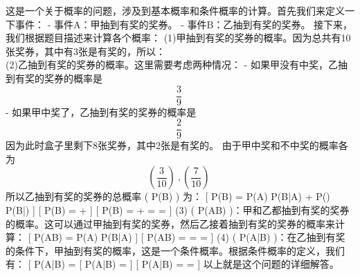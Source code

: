 
这是一个关于概率的问题，涉及到基本概率和条件概率的计算。首先我们来定义一下事件： - 事件A：甲抽到有奖的奖券。 - 事件B：乙抽到有奖的奖券。 接下来，我们根据题目描述来计算各个概率： (1)甲抽到有奖的奖券的概率。因为总共有10张奖券，其中有3张是有奖的，所以： \begin{equation}
[ P(A) = \frac{3}{10} ] ~
\end{equation}(2)乙抽到有奖的奖券的概率。这里需要考虑两种情况： - 如果甲没有中奖，乙抽到有奖的奖券的概率是
\begin{equation}
 \frac{3}{9}~
\end{equation}
 - 如果甲中奖了，乙抽到有奖的奖券的概率是 \begin{equation}
 \frac{2}{9}~
 \end{equation}因为此时盒子里剩下8张奖券，其中2张是有奖的。 由于甲中奖和不中奖的概率各为 \begin{equation}
 ( \frac{3}{10} )~,(\frac{7}{10})~
 \end{equation}所以乙抽到有奖的奖券的总概率 ( P(B) ) 为： [ P(B) = P(A) \cdot P(B|A) + P() \cdot P(B|) ] [ P(B) =  \cdot {} +  \cdot {} ] [ P(B) =  +  =  =  ] (3) ( P(AB) )：甲和乙都抽到有奖的奖券的概率。这可以通过甲抽到有奖的奖券，然后乙接着抽到有奖的奖券的概率来计算： [ P(AB) = P(A) \cdot P(B|A) ] [ P(AB) =  \cdot {} =  =  ] (4) ( P(A|B) )：在乙抽到有奖的条件下，甲抽到有奖的概率，这是一个条件概率。根据条件概率的定义，我们有： [ P(A|B) =  [ P(A|B) =  ] [ P(A|B) =  \cdot {} =  ] 以上就是这个问题的详细解答。

